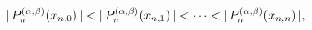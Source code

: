\[|\mathop{P^{(\alpha,\beta)}_{n}\/}\nolimits\!\left(x_{n,0}\right)|<|\mathop{P^%
{(\alpha,\beta)}_{n}\/}\nolimits\!\left(x_{n,1}\right)|<\cdots<|\mathop{P^{(%
\alpha,\beta)}_{n}\/}\nolimits\!\left(x_{n,n}\right)|,\]